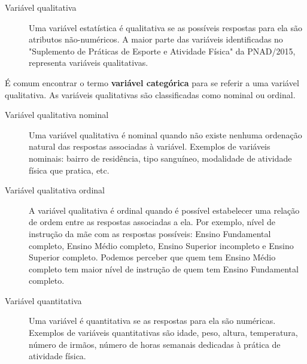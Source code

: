 \begin{description}
\item[{Variável qualitativa}] \leavevmode{}\label{est1-def-7}
Uma variável estatística é qualitativa se as possíveis respostas para ela são atributos não-numéricos. A maior parte das variáveis identificadas no "Suplemento de Práticas de Esporte e Atividade Física" da PNAD/2015, representa variáveis qualitativas.
\end{description}

É comum encontrar o termo \textbf{variável categórica} para se referir a uma variável qualitativa. As variáveis qualitativas são classificadas como nominal ou ordinal.

\begin{description}
\item[{Variável qualitativa nominal}] \leavevmode{}\label{est1-def-8}
Uma variável qualitativa é nominal quando não existe nenhuma ordenação natural das respostas associadas à variável. Exemplos de variáveis nominais: bairro de residência, tipo sanguíneo, modalidade de atividade física que pratica, etc.
\end{description}

\begin{description}
\item[{Variável qualitativa ordinal}] \leavevmode{}\label{est1-def-9}
A variável qualitativa é ordinal quando é possível estabelecer uma relação de ordem entre as respostas associadas a ela. Por exemplo, nível de instrução da mãe com as respostas possíveis: Ensino Fundamental completo, Ensino Médio completo, Ensino Superior incompleto e Ensino Superior completo. Podemos perceber que quem tem Ensino Médio completo tem maior nível de instrução de quem tem Ensino Fundamental completo.
\end{description}

\begin{description}
\item[{Variável quantitativa}] \leavevmode{}\label{est1-def-10}
Uma variável é quantitativa se as respostas para ela são numéricas. Exemplos de variáveis quantitativas são idade, peso, altura, temperatura, número de irmãos, número de horas semanais dedicadas à prática de atividade física.
\end{description}

